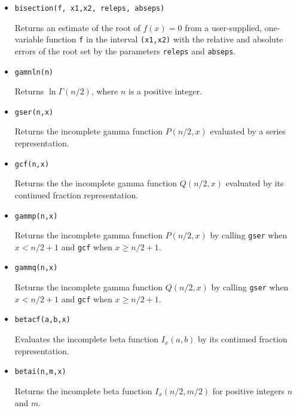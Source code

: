 \documentclass[12pt]{article}
\begin{document}
\begin{itemize}
\item {\tt bisection(f, x1,x2, releps, abseps)} 

Returns an estimate of the root of $f(x)=0$ from a user-supplied, one-variable function {\tt f}
in the interval {\tt (x1,x2)} with the relative and absolute errors of the root 
set by the parameters {\tt releps} and {\tt abseps}.

\item {\tt gamnln(n)} 

Returns $\ln \Gamma(n/2)$, where $n$ is a positive integer.

\item {\tt gser(n,x)}

Returns the incomplete gamma function $P(n/2,x)$ evaluated by a
series representation.


\item {\tt gcf(n,x)} 

Returns the the incomplete gamma function $Q(n/2,x)$ evaluated by
its continued fraction representation. 

\item {\tt gammp(n,x)} 

Returns the incomplete gamma function $P(n/2,x)$ by calling 
{\tt gser} when $x<n/2+1$ and {\tt gcf} when $x \geq n/2+1$.

\item {\tt gammq(n,x)} 

Returns the incomplete gamma function $Q(n/2,x)$ by calling 
{\tt gser} when $x<n/2+1$ and {\tt gcf} when $x \geq n/2+1$.

\item {\tt betacf(a,b,x)} 

Evaluates the incomplete beta function $I_x(a,b)$ by its continued 
fraction representation. 

\item {\tt betai(n,m,x)} 

Returns the incomplete beta function $I_x(n/2,m/2)$ for positive integers 
$n$ and $m$.

\end{itemize}
\end{document}
